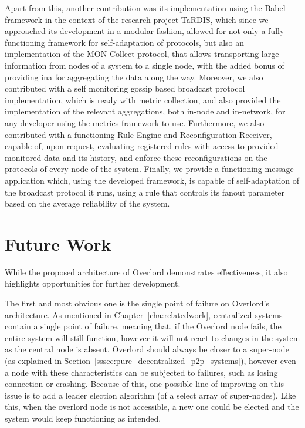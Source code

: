 Apart from this, another contribution was its implementation using the Babel framework\cite{Fouto2022} in the context of the research project TaRDIS\cite{TARDIS2023}, which since we approached its development in a modular fashion, allowed for not only a fully functioning framework for self-adaptation of protocols, but also an implementation of the MON-Collect protocol, that allows transporting large information from nodes of a system to a single node, with the added bonus of providing \gls{ina} for aggregating the data along the way. Moreover, we also contributed with a self monitoring gossip based broadcast protocol implementation, which is ready with metric collection, and also provided the implementation of the relevant aggregations, both in-node and in-network, for any developer using the metrics framework to use. Furthermore, we also contributed with a functioning Rule Engine and Reconfiguration Receiver, capable of, upon request, evaluating registered rules with access to provided monitored data and its history, and enforce these reconfigurations on the protocols of every node of the system. Finally, we provide a functioning message application which, using the developed framework, is capable of self-adaptation of the broadcast protocol it runs, using a rule that controls its fanout parameter based on the average reliability of the system.

\section{Future Work}
\label{sec:future_work}
While the proposed architecture of Overlord demonstrates effectiveness, it also highlights opportunities for further development.

The first and most obvious one is the single point of failure on Overlord's architecture. As mentioned in Chapter~\ref{cha:relatedwork}, centralized systems contain a single point of failure, meaning that, if the Overlord node fails, the entire system will still function, however it will not react to changes in the system as the central node is absent. Overlord should always be closer to a super-node (as explained in Section~\ref{sssec:pure_decentralized_p2p_systems}), however even a node with these characteristics can be subjected to failures, such as losing connection or crashing. Because of this, one possible line of improving on this issue is to add a leader election algorithm (of a select array of super-nodes). Like this, when the overlord node is not accessible, a new one could be elected and the system would keep functioning as intended.

